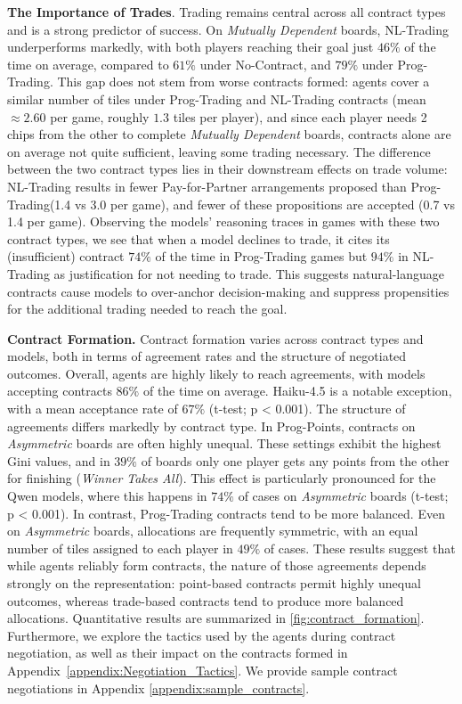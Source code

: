 \documentclass{article} %
\newcommand{\PTC}{Prog-Trading\xspace}
\newcommand{\NLTC}{NL-Trading\xspace}
\newcommand{\PPC}{Prog-Points\xspace}
\newcommand{\Haiku}{Haiku-4.5\xspace}
\newcommand{\PforP}{Pay-for-Partner\xspace}
\begin{document}
\textbf{The Importance of Trades}. Trading remains central across all contract types and is a strong predictor of success. On \textit{Mutually Dependent} boards, \NLTC underperforms markedly, with both players reaching their goal just $46\%$ of the time on average, compared to $61\%$  under No-Contract, and $79\%$ under \PTC. This gap does not stem from worse contracts formed: agents cover a similar number of tiles under \PTC and \NLTC contracts (mean $\approx2.60$ per game, roughly $1.3$ tiles per player), and since each player needs 2 chips from the other to complete \textit{Mutually Dependent} boards, contracts alone are on average not quite sufficient, leaving some trading necessary. The difference between the two contract types lies in their downstream effects on trade volume: \NLTC results in fewer \PforP arrangements proposed than \PTC (1.4 vs 3.0 per game), and fewer of these propositions are accepted (0.7 vs 1.4 per game). Observing the models' reasoning traces in games with these two contract types, we see that when a model declines to trade, it cites its (insufficient) contract $74\%$ of the time in \PTC games but $94\%$ in \NLTC as justification for not needing to trade. This suggests natural-language contracts cause models to over-anchor decision-making and suppress propensities for the additional trading needed to reach the goal.


\textbf{Contract Formation.} Contract formation varies across contract types and models, both in terms of agreement rates and the structure of negotiated outcomes. Overall, agents are highly likely to reach agreements, with models accepting contracts $86\%$ of the time on average. \Haiku is a notable exception, with a mean acceptance rate of $67\%$ (t-test; p < 0.001). 
The structure of agreements differs markedly by contract type. In \PPC, contracts on \textit{Asymmetric} boards are often highly unequal. These settings exhibit the highest Gini values, and in $39\%$ of boards only one player gets any points from the other for finishing (\textit{Winner Takes All}). This effect is particularly pronounced for the Qwen models, where this happens in $74\%$ of cases on \textit{Asymmetric} boards (t-test; p < 0.001).
In contrast, \PTC contracts tend to be more balanced. Even on \textit{Asymmetric} boards, allocations are frequently symmetric, with an equal number of tiles assigned to each player in $49\%$ of cases. These results suggest that while agents reliably form contracts, the nature of those agreements depends strongly on the representation: point-based contracts permit highly unequal outcomes, whereas trade-based contracts tend to produce more balanced allocations. Quantitative results are summarized in \cref{fig:contract_formation}. Furthermore, we explore the tactics used by the agents during contract negotiation, as well as their impact on the contracts formed in Appendix~\ref{appendix:Negotiation_Tactics}. We provide sample contract negotiations in Appendix \ref{appendix:sample_contracts}.
\end{document}
